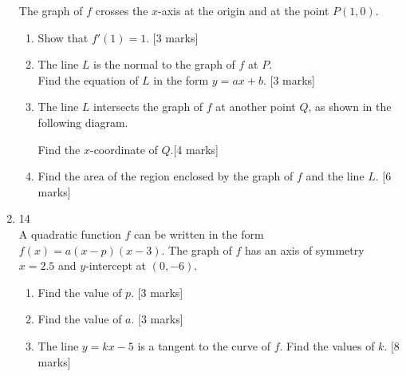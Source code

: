 \documentclass[12pt, twoside]{article}
\begin{document}
\begin{enumerate}
        The graph of $f$ crosses the $x$-axis at the origin and at the point $P(1,0)$.
        \begin{enumerate}
          \item Show that $f'(1)=1$. [3 marks]
          \item The line $L$ is the normal to the graph of $f$ at $P$.\\
          Find the equation of $L$ in the form $y=ax+b$. [3 marks]
          \item The line $L$ intersects the graph of $f$ at another point $Q$, as shown in the following diagram.
            \begin{center}
            \end{center}
            Find the $x$-coordinate of $Q$.[4 marks]
            \item Find the area of the region enclosed by the graph of $f$ and the line $L$.  [6 marks]
        \end{enumerate}

        \item 14\\
        A quadratic function $f$ can be written in the form  $f(x)=a(x-p)(x-3)$. The graph of $f$ has an axis of symmetry $x=2.5$ and $y$-intercept at $(0,-6)$.
        \begin{enumerate}
          \item Find the value of $p$. [3 marks]
          \item Find the value of $a$. [3 marks]
          \item The line $y=kx-5$ is a tangent to the curve of $f$. Find the values of $k$. [8 marks]
        \end{enumerate}

\end{enumerate}
\end{document}
